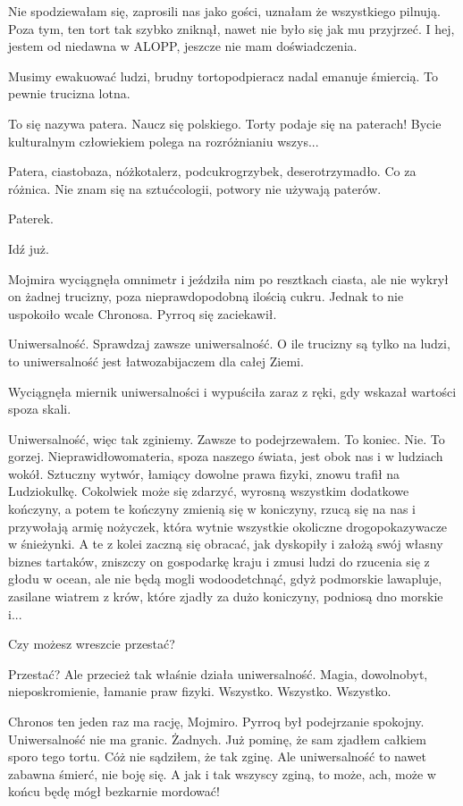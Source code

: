 \ds{} Nie spodziewałam się, zaprosili nas jako gości, uznałam że wszystkiego pilnują. Poza tym, ten tort tak szybko zniknął, nawet nie było się jak mu przyjrzeć. 
I hej, jestem od niedawna w ALOPP, jeszcze nie mam doświadczenia. \de{}

\ds{} Musimy ewakuować ludzi, brudny tortopodpieracz nadal emanuje śmiercią. To pewnie trucizna lotna. \de{}

\ds{} To się nazywa patera. Naucz się polskiego. Torty podaje się na paterach! Bycie kulturalnym człowiekiem polega na rozróżnianiu wszys... \de{}

\ds{} Patera, ciastobaza, nóżkotalerz, podcukrogrzybek, deserotrzymadło. Co za różnica. Nie znam się na sztućcologii, potwory nie używają paterów. \de{}

\ds{} Paterek. \de{}

\ds{} Idź już. \de{}

Mojmira wyciągnęła omnimetr i jeździła nim po resztkach ciasta, ale nie wykrył on żadnej trucizny, poza nieprawdopodobną ilością cukru.
Jednak to nie uspokoiło wcale Chronosa. Pyrroq się zaciekawił.

\ds{} Uniwersalność. Sprawdzaj zawsze uniwersalność. O ile trucizny są tylko na ludzi, to uniwersalność jest łatwozabijaczem dla całej Ziemi. \de{}

Wyciągnęła miernik uniwersalności i wypuściła zaraz z ręki, gdy wskazał wartości spoza skali.

\ds{} Uniwersalność, więc tak zginiemy. Zawsze to podejrzewałem. To koniec. Nie. To gorzej. Nieprawidłowomateria, spoza naszego świata, jest obok nas i w ludziach wokół.
Sztuczny wytwór, łamiący dowolne prawa fizyki, znowu trafił na Ludziokulkę.
Cokolwiek może się zdarzyć, wyrosną wszystkim dodatkowe kończyny, a potem te kończyny zmienią się w koniczyny, rzucą się na nas i przywołają armię nożyczek, która wytnie wszystkie okoliczne drogopokazywacze w śnieżynki. 
A te z kolei zaczną się obracać, jak dyskopiły i założą swój własny biznes tartaków, zniszczy on gospodarkę kraju i zmusi ludzi do rzucenia się z głodu w ocean, ale nie będą mogli wodoodetchnąć, 
gdyż podmorskie lawapluje, zasilane wiatrem z krów, które zjadły za dużo koniczyny, podniosą dno morskie i... \de{}

\ds{} Czy możesz wreszcie przestać? \de{}

\ds{} Przestać? Ale przecież tak właśnie działa uniwersalność. Magia, dowolnobyt, nieposkromienie, łamanie praw fizyki. Wszystko. Wszystko. Wszystko. \de{}

\ds{} Chronos ten jeden raz ma rację, Mojmiro. \dm{} Pyrroq był podejrzanie spokojny. \dm{} Uniwersalność nie ma granic. Żadnych. 
Już pominę, że sam zjadłem całkiem sporo tego tortu. Cóż nie sądziłem, że tak zginę. Ale uniwersalność to nawet zabawna śmierć, nie boję się. 
A jak i tak wszyscy zginą, to może, ach, może w końcu będę mógł bezkarnie mordować! \de{}

